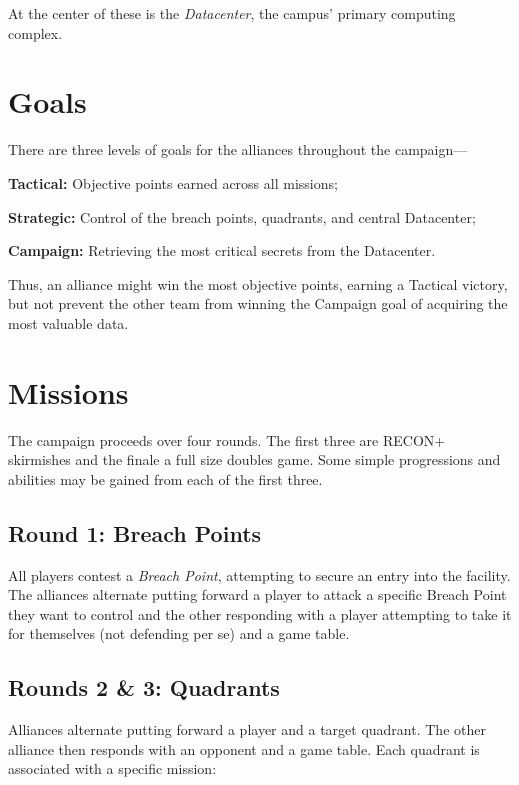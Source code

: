 At the center of these is the \textit{Datacenter}, the campus' primary
computing complex.

\clearpage
\section{Goals}

There are three levels of goals for the alliances throughout the campaign---

\begin{squishitemize}  
\item \textbf{Tactical:} Objective points earned across all missions;
\item \textbf{Strategic:} Control of the breach points, quadrants, and central
  Datacenter;
\item \textbf{Campaign:} Retrieving the most critical secrets from the
  Datacenter.
\end{squishitemize}

Thus, an alliance might win the most objective points, earning a
Tactical victory, but not prevent the other team from winning the
Campaign goal of acquiring the most valuable data.

\section{Missions}

The campaign proceeds over four rounds.  The first three are RECON+
skirmishes and the finale a full size doubles game.  Some simple
progressions and abilities may be gained from each of the first three.

\subsection{Round 1: Breach Points}

All players contest a \textit{Breach Point}, attempting to secure an
entry into the facility.  The alliances alternate putting forward a
player to attack a specific Breach Point they want to control and the
other responding with a player attempting to take it for themselves
(not defending per se) and a game table.

\subsection{Rounds 2 \& 3: Quadrants}

Alliances alternate putting forward a player and a target quadrant.
The other alliance then responds with an opponent and a game table.
Each quadrant is associated with a specific mission:

